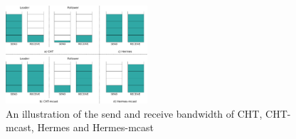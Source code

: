 \begin{figure}[t]
  \centering
  \includegraphics[width=0.47\textwidth]{1_figures/mcast.pdf}
  \caption{An illustration of the send and receive bandwidth of CHT, CHT-mcast, Hermes and Hermes-mcast}
  \label{fig:mcast}
\end{figure}
